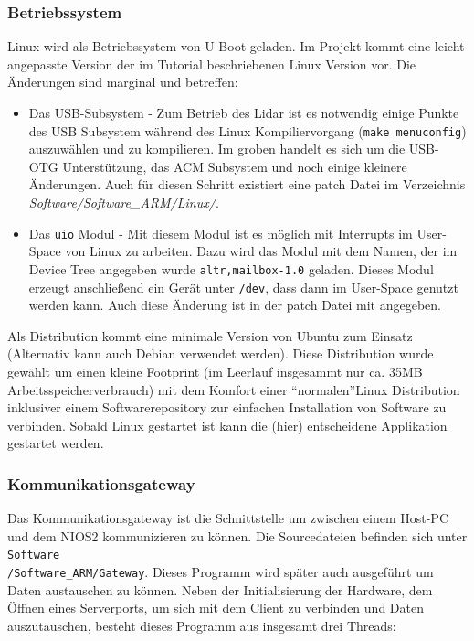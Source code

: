 \subsubsection{Betriebssystem}
Linux wird als Betriebssystem von U-Boot geladen. Im Projekt kommt eine leicht angepasste Version der im Tutorial beschriebenen Linux Version vor. Die Änderungen sind marginal und betreffen:
\begin{itemize}
	\item Das USB-Subsystem - Zum Betrieb des \ac{Lidar} ist es notwendig einige Punkte des USB Subsystem während des Linux Kompiliervorgang (\lstinline|make menuconfig|) auszuwählen und zu kompilieren. Im groben handelt es sich um die USB-OTG Unterstützung, das ACM Subsystem und noch einige kleinere Änderungen. Auch für diesen Schritt existiert eine patch Datei im Verzeichnis \textit{Software/Software\_ARM/Linux/}.
	\item Das \texttt{uio} Modul - Mit diesem Modul ist es möglich mit Interrupts im User-Space von Linux zu arbeiten. Dazu wird das Modul mit dem Namen, der im Device Tree angegeben wurde \lstinline|altr,mailbox-1.0| geladen. Dieses Modul erzeugt anschließend ein Gerät unter \texttt{/dev}, dass dann im User-Space genutzt werden kann. Auch diese Änderung ist in der patch Datei mit angegeben.
\end{itemize}
Als Distribution kommt eine minimale Version von Ubuntu zum Einsatz (Alternativ kann auch Debian verwendet werden). Diese Distribution wurde gewählt um einen kleine Footprint (im Leerlauf insgesammt nur ca. 35MB Arbeitsspeicherverbrauch) mit dem Komfort einer \textquotedblleft normalen\textquotedblright Linux Distribution inklusiver einem Softwarerepository zur einfachen Installation von Software zu verbinden. Sobald Linux gestartet ist kann die (hier) entscheidene Applikation gestartet werden.

\subsubsection{Kommunikationsgateway}
Das Kommunikationsgateway ist die Schnittstelle um zwischen einem Host-PC und dem NIOS2 kommunizieren zu können. Die Sourcedateien befinden sich unter \texttt{Software\\/Software\_ARM/Gateway}. Dieses Programm wird später auch ausgeführt um Daten austauschen zu können. Neben der Initialisierung der Hardware, dem Öffnen eines Serverports, um sich mit dem Client zu verbinden und Daten auszutauschen, besteht dieses Programm aus insgesamt drei Threads:

